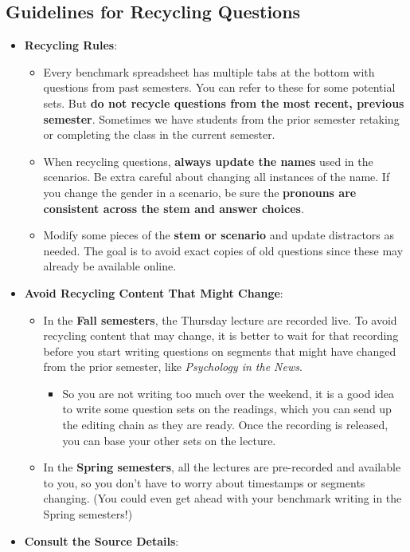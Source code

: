 \documentclass[
]{article}
\providecommand{\tightlist}{%
  \setlength{\itemsep}{0pt}\setlength{\parskip}{0pt}}
\begin{document}
\hypertarget{guidelines-for-recycling-questions}{%
\subsection{Guidelines for Recycling Questions}\label{guidelines-for-recycling-questions}}

\begin{itemize}
\tightlist
\item
  \textbf{Recycling Rules}:

  \begin{itemize}
  \tightlist
  \item
    Every benchmark spreadsheet has multiple tabs at the bottom with questions from past semesters. You can refer to these for some potential sets. But \textbf{do not recycle questions from the most recent, previous semester}. Sometimes we have students from the prior semester retaking or completing the class in the current semester.
  \item
    When recycling questions, \textbf{always update the names} used in the scenarios. Be extra careful about changing all instances of the name. If you change the gender in a scenario, be sure the \textbf{pronouns are consistent across the stem and answer choices}.
  \item
    Modify some pieces of the \textbf{stem or scenario} and update distractors as needed. The goal is to avoid exact copies of old questions since these may already be available online.
  \end{itemize}
\item
  \textbf{Avoid Recycling Content That Might Change}:

  \begin{itemize}
  \tightlist
  \item
    In the \textbf{Fall semesters}, the Thursday lecture are recorded live. To avoid recycling content that may change, it is better to wait for that recording before you start writing questions on segments that might have changed from the prior semester, like \emph{Psychology in the News}.

    \begin{itemize}
    \tightlist
    \item
      So you are not writing too much over the weekend, it is a good idea to write some question sets on the readings, which you can send up the editing chain as they are ready. Once the recording is released, you can base your other sets on the lecture.\\
    \end{itemize}
  \item
    In the \textbf{Spring semesters}, all the lectures are pre-recorded and available to you, so you don't have to worry about timestamps or segments changing. (You could even get ahead with your benchmark writing in the Spring semesters!)
  \end{itemize}
\item
  \textbf{Consult the Source Details}:


\end{itemize}
\end{document}
